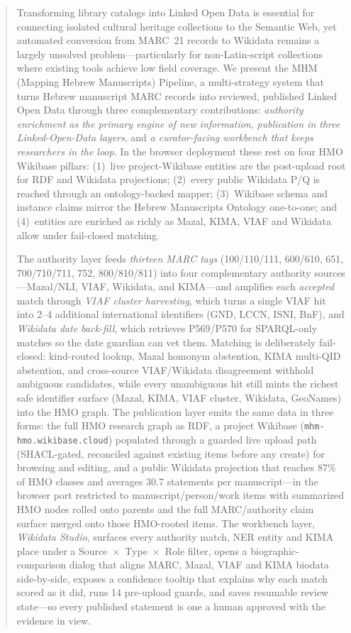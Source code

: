 \documentclass[Afour,sageh,times]{sagej}
\begin{document}
\begin{abstract}
Transforming library catalogs into Linked Open Data is essential for connecting isolated cultural heritage collections to the Semantic Web, yet automated conversion from MARC~21 records to Wikidata remains a largely unsolved problem---particularly for non-Latin-script collections where existing tools achieve low field coverage. We present the MHM (Mapping Hebrew Manuscripts) Pipeline, a multi-strategy system that turns Hebrew manuscript MARC records into reviewed, published Linked Open Data through three complementary contributions: \emph{authority enrichment as the primary engine of new information}, \emph{publication in three Linked-Open-Data layers}, and \emph{a curator-facing workbench that keeps researchers in the loop}. In the browser deployment these rest on four HMO Wikibase pillars: (1)~live project-Wikibase entities are the post-upload root for RDF and Wikidata projections; (2)~every public Wikidata P/Q is reached through an ontology-backed mapper; (3)~Wikibase schema and instance claims mirror the Hebrew Manuscripts Ontology one-to-one; and (4)~entities are enriched as richly as Mazal, KIMA, VIAF and Wikidata allow under fail-closed matching.

The authority layer feeds \emph{thirteen MARC tags} (100/110/111, 600/610, 651, 700/710/711, 752, 800/810/811) into four complementary authority sources---Mazal/NLI, VIAF, Wikidata, and KIMA---and amplifies each \emph{accepted} match through \emph{VIAF cluster harvesting}, which turns a single VIAF hit into 2--4 additional international identifiers (GND, LCCN, ISNI, BnF), and \emph{Wikidata date back-fill}, which retrieves P569/P570 for SPARQL-only matches so the date guardian can vet them. Matching is deliberately fail-closed: kind-routed lookup, Mazal homonym abstention, KIMA multi-QID abstention, and cross-source VIAF/Wikidata disagreement withhold ambiguous candidates, while every unambiguous hit still mints the richest safe identifier surface (Mazal, KIMA, VIAF cluster, Wikidata, GeoNames) into the HMO graph. The publication layer emits the same data in three forms: the full HMO research graph as RDF, a project Wikibase (\texttt{mhm-hmo.wikibase.cloud}) populated through a guarded live upload path (SHACL-gated, reconciled against existing items before any create) for browsing and editing, and a public Wikidata projection that reaches 87\% of HMO classes and averages 30.7 statements per manuscript---in the browser port restricted to manuscript/person/work items with summarized HMO nodes rolled onto parents and the full MARC/authority claim surface merged onto those HMO-rooted items. The workbench layer, \emph{Wikidata Studio}, surfaces every authority match, NER entity and KIMA place under a Source~$\times$~Type~$\times$~Role filter, opens a biographic-comparison dialog that aligns MARC, Mazal, VIAF and KIMA biodata side-by-side, exposes a confidence tooltip that explains why each match scored as it did, runs 14 pre-upload guards, and saves resumable review state---so every published statement is one a human approved with the evidence in view.


\end{abstract}
\end{document}
